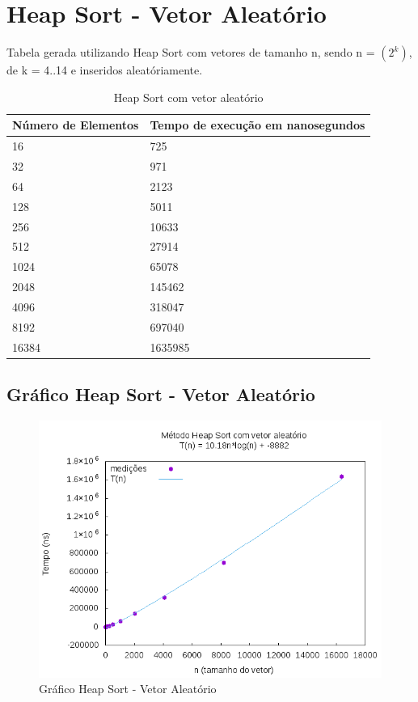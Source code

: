 \documentclass[12pt,a4paper,twoside]{report}
\begin{document}
\section{Heap Sort - Vetor Aleatório}
Tabela gerada utilizando Heap Sort com vetores de tamanho n, sendo n = $(2^k)$, de k = 4..14 e inseridos aleatóriamente.
\begin{table}[H]
\centering
\caption{Heap Sort com vetor aleatório}
\label{my-label}
\begin{tabular}{|l|l|}
\hline
\multicolumn{1}{|c|}{\textbf{Número de Elementos}} & \multicolumn{1}{c|}{\textbf{Tempo de execução em nanosegundos}} \\ \hline
16 & 725 \\ \hline
32 & 971 \\ \hline
64 & 2123 \\ \hline
128 & 5011 \\ \hline
256 & 10633 \\ \hline
512 & 27914 \\ \hline
1024 & 65078 \\ \hline
2048 & 145462 \\ \hline
4096 & 318047 \\ \hline
8192 & 697040 \\ \hline
16384 & 1635985 \\ \hline
\end{tabular}
\end{table}

\subsection{Gráfico Heap Sort - Vetor Aleatório}
\begin{figure}[H]
    \centering
    \includegraphics[width=0.7\linewidth]{graficos/HeapSort/vIntAleatorio/vIntAleatorio.png}
  \caption{Gráfico Heap Sort - Vetor Aleatório}
\end{figure}
\end{document}
